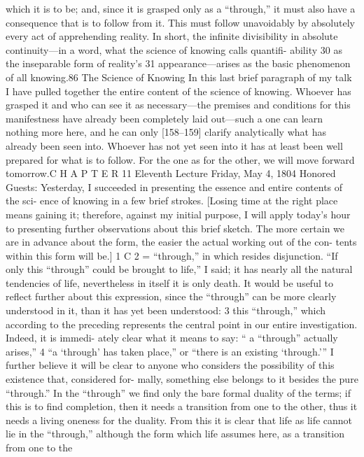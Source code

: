 which it is to be; and, since it is grasped only as a “through,” it must also have
a consequence that is to follow from it. This must follow unavoidably by
absolutely every act of apprehending reality. In short, the infinite divisibility
in absolute continuity—in a word, what the science of knowing calls quantifi-
ability 30 as the inseparable form of reality’s 31 appearance—arises as the basic
phenomenon of all knowing.86
The Science of Knowing
In this last brief paragraph of my talk I have pulled together the entire
content of the science of knowing. Whoever has grasped it and who can see
it as necessary—the premises and conditions for this manifestness have
already been completely laid out—such a one can learn nothing more here,
and he can only [158–159] clarify analytically what has already been seen into.
Whoever has not yet seen into it has at least been well prepared for what is to
follow. For the one as for the other, we will move forward tomorrow.C H A P T E R
11
Eleventh Lecture
Friday, May 4, 1804
Honored Guests:
Yesterday, I succeeded in presenting the essence and entire contents of the sci-
ence of knowing in a few brief strokes. [Losing time at the right place means
gaining it; therefore, against my initial purpose, I will apply today’s hour to
presenting further observations about this brief sketch. The more certain we
are in advance about the form, the easier the actual working out of the con-
tents within this form will be.] 1
C 2 = “through,” in which resides disjunction. “If only this “through”
could be brought to life,” I said; it has nearly all the natural tendencies of life,
nevertheless in itself it is only death. It would be useful to reflect further about
this expression, since the “through” can be more clearly understood in it, than
it has yet been understood: 3 this “through,” which according to the preceding
represents the central point in our entire investigation. Indeed, it is immedi-
ately clear what it means to say: “ a “through” actually arises,” 4 “a ‘through’ has
taken place,” or “there is an existing ‘through.’” I further believe it will be clear
to anyone who considers the possibility of this existence that, considered for-
mally, something else belongs to it besides the pure “through.” In the “through”
we find only the bare formal duality of the terms; if this is to find completion,
then it needs a transition from one to the other, thus it needs a living oneness
for the duality. From this it is clear that life as life cannot lie in the “through,”
although the form which life assumes here, as a transition from one to the

